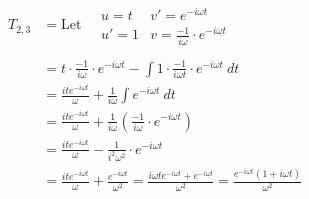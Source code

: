 \documentclass[preview]{standalone}
\begin{document}
\begin{align*}
T_{2,3}&= \textrm{Let} \quad \begin{array}{rl}u=t & v'=e^{-i\omega t} \\ u'=1 & v=\frac{-1}{i\omega}\cdot e^{-i\omega t} \end{array} \\ \\  &=t\cdot \frac{-1}{i\omega}\cdot e^{-i\omega t}-\int 1\cdot \frac{-1}{i\omega t}\cdot e^{-i\omega t} \ dt \\ &=\frac{ite^{-i\omega t}}{\omega}+\frac{1}{i\omega}\int e^{-i\omega t} \ dt \\ &=\frac{ite^{-i\omega t}}{\omega}+\frac{1}{i\omega}\left(\frac{-1}{i\omega}\cdot e^{-i\omega t}\right) \\ &=\frac{ite^{-i\omega t}}{\omega}-\frac{1}{i^{2}\omega^{2}}\cdot e^{-i\omega t} \\ &=\frac{ite^{-i\omega t}}{\omega}+\frac{e^{-i\omega t}}{\omega^{2}} =\frac{i\omega t e^{-i\omega t}+e^{-i\omega t}}{\omega^{2}} = \frac{e^{-i\omega t}(1+i\omega t)}{\omega^{2}}
\end{align*}
\end{document}

